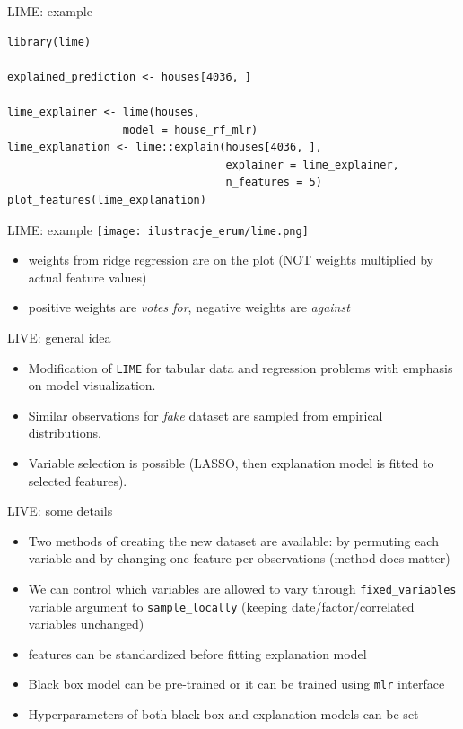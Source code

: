\documentclass[xcolor={dvipsnames}]{beamer}
\begin{document}
\begin{frame}[fragile]{LIME: example}
\begin{lstlisting}
library(lime)

explained_prediction <- houses[4036, ]

lime_explainer <- lime(houses,
                  model = house_rf_mlr)
lime_explanation <- lime::explain(houses[4036, ],
                                  explainer = lime_explainer,
                                  n_features = 5)
plot_features(lime_explanation)	
\end{lstlisting}
\end{frame}

\begin{frame}{LIME: example}
	\centering
\texttt{[image: ilustracje\_erum/lime.png]}
\begin{itemize}
	\item weights from ridge regression are on the plot (NOT weights multiplied by actual feature values)
	\item positive weights are \textit{votes for}, negative weights are \textit{against}
\end{itemize}
\end{frame}

\begin{frame}{LIVE: general idea}
   \begin{itemize}
   	\item Modification of \texttt{LIME} for tabular data and regression problems with emphasis on model visualization.
   	\item Similar observations for \textit{fake} dataset are sampled from empirical distributions.
    \item Variable selection is possible (LASSO, then explanation model is fitted to selected features).
   \end{itemize}
\end{frame}

\begin{frame}{LIVE: some details}
	\begin{itemize}
	\item Two methods of creating the new dataset are available: by permuting each variable and by changing one feature per observations (method does matter)
	\item We can control which variables are allowed to vary through \texttt{fixed\_variables} variable argument to \texttt{sample\_locally} (keeping date/factor/correlated variables unchanged)
	\item features can be standardized before fitting explanation model
	\item Black box model can be pre-trained or it can be trained using \texttt{mlr} interface
	\item Hyperparameters of both black box and explanation models can be set
	\end{itemize}
	
\end{frame}
\end{document}
